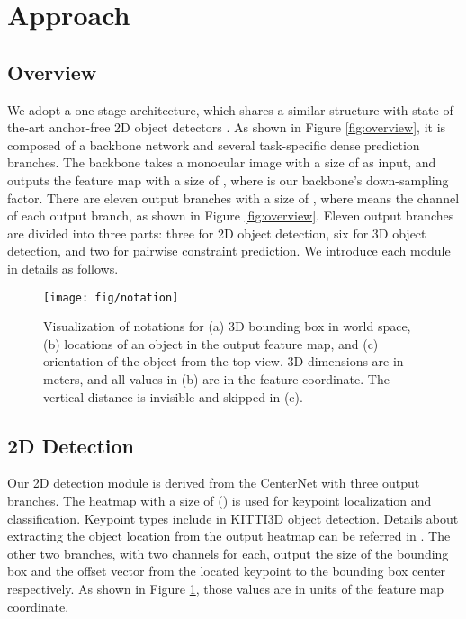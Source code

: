 \documentclass[10pt,twocolumn,letterpaper]{article}
\begin{document}
\section{Approach}
\label{sec:approach}

\subsection{Overview}

We adopt a one-stage architecture, which shares a similar structure with state-of-the-art anchor-free 2D object detectors \cite{tian_fcos_2019,zhou_objects_2019}.
As shown in Figure \ref{fig:overview}, it is composed of a backbone network and several task-specific dense prediction branches.
The backbone takes a monocular image  with a size of  as input, and outputs the feature map with a size of , where  is our backbone's down-sampling factor.
There are eleven output branches with a size of , where  means the channel of each output branch, as shown in Figure \ref{fig:overview}.
Eleven output branches are divided into three parts: three for 2D object detection, six for 3D object detection, and two for pairwise constraint prediction. We introduce each module in details as follows.






\begin{figure}[!t]
	\texttt{[image: fig/notation]}
	\caption{
	Visualization of notations for (a) 3D bounding box in world space, (b) locations of an object in the output feature map, and (c) orientation of the object from the top view. 3D dimensions are in meters, and all values in (b) are in the feature coordinate. The vertical distance  is invisible and skipped in (c).
	}
	\label{fig:2d_3d_det}
\end{figure}


\subsection{2D Detection}

Our 2D detection module is derived from the CenterNet \cite{zhou_objects_2019} with three output branches. The heatmap with a size of () is used for keypoint localization and classification. Keypoint types include  in KITTI3D object detection. Details about extracting the object location  from the output heatmap can be referred in \cite{zhou_objects_2019}.
The other two branches, with two channels for each, output the size of the bounding box  and the offset vector  from the located keypoint  to the bounding box center  respectively. As shown in Figure \ref{fig:2d_3d_det}, those values are in units of the feature map coordinate.
\end{document}
